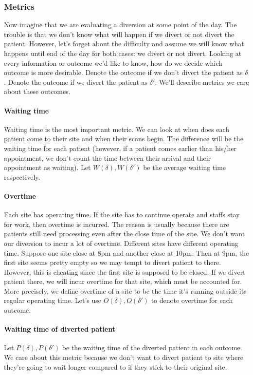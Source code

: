 \subsubsection{Metrics}

Now imagine that we are evaluating a diversion at some point of the day. The trouble is that we don't know what will happen if we divert or not divert the patient. However, let's forget about the difficulty and assume we will know what happens until end of the day for both cases: we divert or not divert. Looking at every information or outcome we'd like to know, how do we decide which outcome is more desirable. Denote the outcome if we don't divert the patient as $\delta$. Denote the outcome if we divert the patient as $\delta'$. We'll describe metrics we care about these outcomes.

\paragraph{Waiting time} Waiting time is the most important metric. We can look at when does each patient come to their site and when their scans begin. The difference will be the waiting time for each patient (however, if a patient comes earlier than his/her appointment, we don't count the time between their arrival and their appointment as waiting). Let $W(\delta), W(\delta')$ be the average waiting time respectively.

\paragraph{Overtime} Each site has operating time. If the site has to continue operate and staffs stay for work, then overtime is incurred. The reason is usually because there are patients still need processing even after the close time of the site. We don't want our diversion to incur a lot of overtime. Different sites have different operating time. Suppose one site close at 8pm and another close at 10pm. Then at 9pm, the first site seems pretty empty so we may tempt to divert patient to there. However, this is cheating since the first site is supposed to be closed. If we divert patient there, we will incur overtime for that site, which must be accounted for. More precisely, we define overtime of a site to be the time it's running outside its regular operating time. Let's use $O(\delta), O(\delta')$ to denote overtime for each outcome.

\paragraph{Waiting time of diverted patient} Let $P(\delta), P(\delta')$ be the waiting time of the diverted patient in each outcome. We care about this metric because we don't want to divert patient to site where they're going to wait longer compared to if they stick to their original site.

